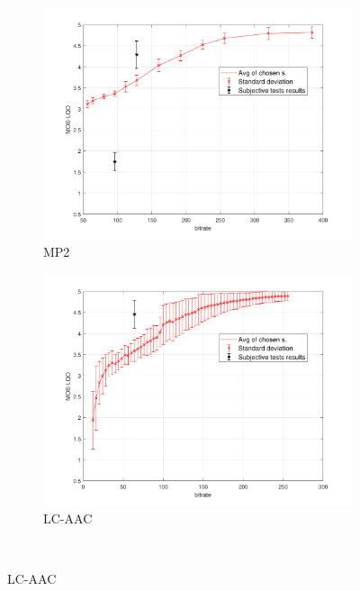 \begin{figure}[H]
    \centering
    \begin{subfigure}{.5\textwidth}
        \centering
        \includegraphics[width=1\linewidth]{pic/objective/mp2Visqol.pdf}
        \caption{MP2}
        \label{fig:vis:sub1}
    \end{subfigure}%
    \begin{subfigure}{.5\textwidth}
        \centering
        \includegraphics[width=1\linewidth]{pic/objective/lcVisqol.pdf}
        \caption{LC-AAC}
        \label{fig:vis:sub2}
    \end{subfigure}
    \\

\end{figure}
